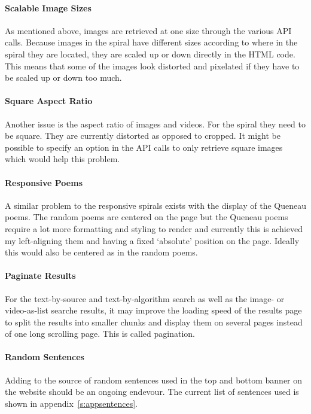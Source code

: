 \documentclass[11pt]{thesis} %
\begin{document}
\paragraph{Scalable Image Sizes} 
As mentioned above, images are retrieved at one size through the various \ac{API} calls. Because images in the spiral have different sizes according to where in the spiral they are located, they are scaled up or down directly in the \ac{HTML} code. This means that some of the images look distorted and pixelated if they have to be scaled up or down too much.

\paragraph{Square Aspect Ratio} 
Another issue is the aspect ratio of images and videos. For the spiral they need to be square. They are currently distorted as opposed to cropped. It might be possible to specify an option in the \ac{API} calls to only retrieve square images which would help this problem.

\paragraph{Responsive Poems} 
A similar problem to the responsive spirals exists with the display of the Queneau poems. The random poems are centered on the page but the Queneau poems require a lot more formatting and styling to render and currently this is achieved my left-aligning them and having a fixed `absolute' position on the page. Ideally this would also be centered as in the random poems. 

\paragraph{Paginate Results}
For the text-by-source and text-by-algorithm search as well as the image- or video-as-list searche results, it may improve the loading speed of the results page to split the results into smaller chunks and display them on several pages instead of one long scrolling page. This is called pagination.

\paragraph{Random Sentences} 
Adding to the source of random sentences used in the top and bottom banner on the website should be an ongoing endevour. The current list of sentences used is shown in appendix~\ref{s:appsentences}.
\end{document}
